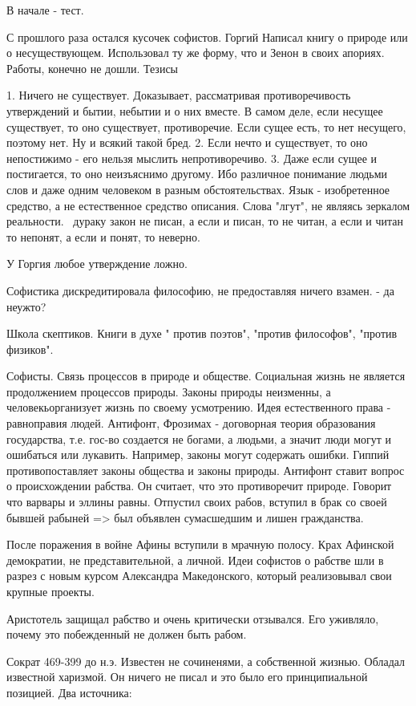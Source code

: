 В начале - тест.

С прошлого раза остался кусочек софистов. 
Горгий 
Написал книгу о природе или о несуществующем. Использовал ту же форму, что и Зенон в своих апориях. Работы, конечно не дошли.
Тезисы

	1. Ничего не существует. Доказывает, рассматривая противоречивость утверждений и бытии, небытии и о них вместе. 
	В самом деле, если несущее существует, то оно существует, противоречие. Если сущее есть, то нет несущего, поэтому нет. Ну и всякий такой бред.
	2. Если нечто и существует, то оно непостижимо - его нельзя мыслить непротиворечиво.
	3. Даже если сущее и постигается, то оно неизъяснимо другому. Ибо различное понимание людьми слов и даже одним человеком в разным обстоятельствах. 
	Язык - изобретенное средство, а не естественное средство описания. Слова "лгут", не являясь зеркалом реальности. ~дураку закон не писан, а если и писан, то не читан, а если и читан то непонят, а если и понят, то неверно.

У Горгия любое утверждение ложно.

Софистика дискредитировала философию, не предоставляя ничего взамен. - да неужто?

Школа скептиков. Книги в духе " против поэтов", "против философов", "против физиков".

Софисты.
Связь процессов в природе и обществе. Социальная жизнь не является продолжением процессов природы. Законы природы неизменны, а человекьорганизует жизнь по своему усмотрению. 
Идея естественного права - равноправия людей. Антифонт, Фрозимах - договорная теория образования государства, т.е. гос-во создается не богами, а людьми, а значит люди могут и ошибаться или лукавить. Например, законы могут содержать ошибки. 
Гиппий противопоставляет законы общества и законы природы. Антифонт ставит вопрос о происхождении рабства. 
Он считает, что это противоречит природе. Говорит что варвары и эллины равны. 
Отпустил своих рабов, вступил в брак со своей бывшей рабыней => был объявлен сумасшедшим и лишен гражданства.

После поражения в войне Афины вступили в мрачную полосу. Крах Афинской демократии, не представительной, а личной. Идеи софистов о рабстве шли в разрез с новым курсом Александра Македонского, который реализовывал свои крупные проекты.

Аристотель защищал рабство и очень критически отзывался. Его уживляло, почему это побежденный не должен быть рабом.

Сократ
469-399 до н.э.
Известен не сочиненями, а собственной жизнью. Обладал известной харизмой. Он ничего не писал и это  было его принципиальной позицией. Два источника: 

